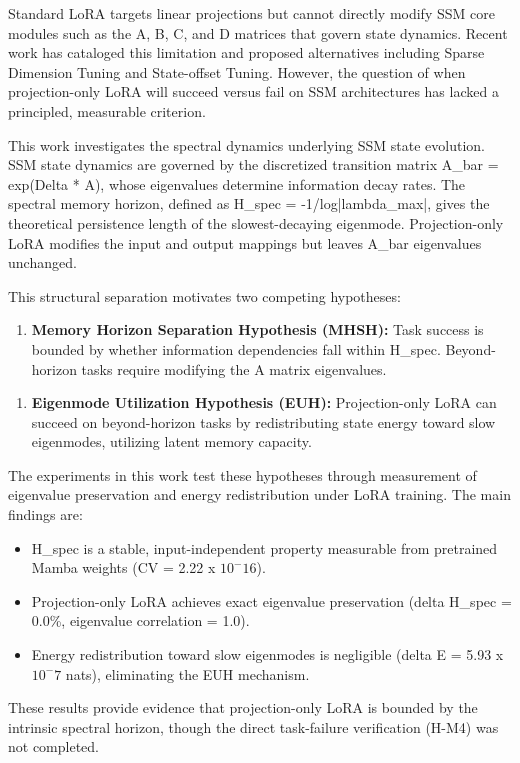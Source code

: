 
Standard LoRA targets linear projections but cannot directly modify SSM core modules such as the A, B, C, and D matrices that govern state dynamics. Recent work has cataloged this limitation and proposed alternatives including Sparse Dimension Tuning and State-offset Tuning. However, the question of when projection-only LoRA will succeed versus fail on SSM architectures has lacked a principled, measurable criterion.

This work investigates the spectral dynamics underlying SSM state evolution. SSM state dynamics are governed by the discretized transition matrix A\_bar = exp(Delta * A), whose eigenvalues determine information decay rates. The spectral memory horizon, defined as H\_spec = -1/log|lambda\_max|, gives the theoretical persistence length of the slowest-decaying eigenmode. Projection-only LoRA modifies the input and output mappings but leaves A\_bar eigenvalues unchanged.

This structural separation motivates two competing hypotheses:

\begin{enumerate}
\item \textbf{Memory Horizon Separation Hypothesis (MHSH):} Task success is bounded by whether information dependencies fall within H\_spec. Beyond-horizon tasks require modifying the A matrix eigenvalues.
\end{enumerate}

\begin{enumerate}
\item \textbf{Eigenmode Utilization Hypothesis (EUH):} Projection-only LoRA can succeed on beyond-horizon tasks by redistributing state energy toward slow eigenmodes, utilizing latent memory capacity.
\end{enumerate}

The experiments in this work test these hypotheses through measurement of eigenvalue preservation and energy redistribution under LoRA training. The main findings are:

\begin{itemize}
\item H\_spec is a stable, input-independent property measurable from pretrained Mamba weights (CV = 2.22 x $10^-16$).
\item Projection-only LoRA achieves exact eigenvalue preservation (delta H\_spec = 0.0\%, eigenvalue correlation = 1.0).
\item Energy redistribution toward slow eigenmodes is negligible (delta E = 5.93 x $10^-7$ nats), eliminating the EUH mechanism.
\end{itemize}

These results provide evidence that projection-only LoRA is bounded by the intrinsic spectral horizon, though the direct task-failure verification (H-M4) was not completed.
